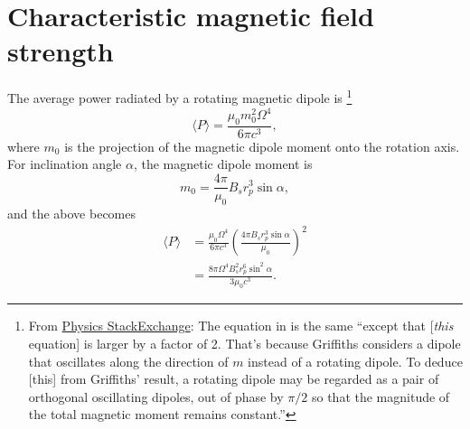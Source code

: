 \documentclass{book}
\begin{document}
\section{Characteristic magnetic field strength}

The average power radiated by a rotating magnetic dipole is \citep[SI units; cf.][Eq. 11.40]{Griffiths1998}\footnote{From \href{https://physics.stackexchange.com/questions/158557/would-a-rotating-magnet-emit-photons-if-so-what-causes-the-torque-that-gradual}{Physics StackExchange}: The equation in \citet{Griffiths1998} is the same ``except that [\emph{this} equation] is larger by a factor of 2. That's because Griffiths considers a dipole that oscillates along the direction of $m$ instead of a rotating dipole. To deduce [this] from Griffiths' result, a rotating dipole may be regarded as a pair of orthogonal oscillating dipoles, out of phase by $\pi/2$ so that the magnitude of the total magnetic moment remains constant.''}
\begin{equation}
  \langle P \rangle = \frac{\mu_0 m_0^2 \Omega^4}{6\pi c^3},
\end{equation}
where $m_0$ is the projection of the magnetic dipole moment onto the rotation axis.
For inclination angle $\alpha$, the magnetic dipole moment is
\begin{equation}
  m_0 = \frac{4\pi}{\mu_0} B_s r_p^3 \sin\alpha,
\end{equation}
and the above becomes
\begin{equation}
  \begin{aligned}
    \langle P \rangle &= \frac{\mu_0 \Omega^4}{6\pi c^3} \left(\frac{4\pi B_s r_p^3 \sin\alpha}{\mu_0}\right)^2 \\
      &= \frac{8\pi \Omega^4 B_s^2 r_p^6 \sin^2\alpha}{3\mu_0 c^3}.
  \end{aligned}
\end{equation}
\end{document}
